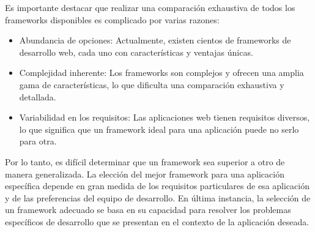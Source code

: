 Es importante destacar que realizar una comparación exhaustiva de todos los frameworks disponibles es complicado por varias razones:

\begin{itemize}
    \item Abundancia de opciones: Actualmente, existen cientos de frameworks de desarrollo web, cada uno con características y ventajas únicas.
    \item Complejidad inherente: Los frameworks son complejos y ofrecen una amplia gama de características, lo que dificulta una comparación exhaustiva y detallada.
    \item Variabilidad en los requisitos: Las aplicaciones web tienen requisitos diversos, lo que significa que un framework ideal para una aplicación puede no serlo para otra.
\end{itemize}

Por lo tanto, es difícil determinar que un framework sea superior a otro de manera generalizada. La elección del mejor framework para una aplicación específica depende en gran medida de los requisitos particulares de esa aplicación y de las preferencias del equipo de desarrollo. En última instancia, la selección de un framework adecuado se basa en su capacidad para resolver los problemas específicos de desarrollo que se presentan en el contexto de la aplicación deseada.
